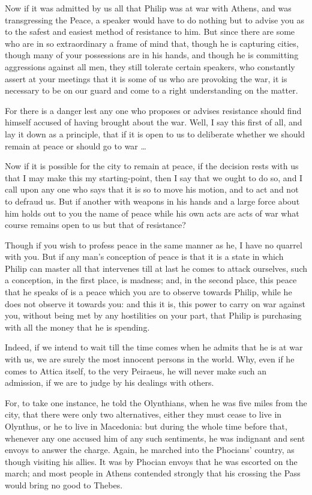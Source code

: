 \documentclass[a4paper]{amsbook}
\begin{document}
Now if it was admitted by us all that Philip was at war with Athens, and was transgressing the Peace, a speaker would have to do nothing but to advise you as to the safest and easiest method of resistance to him. But since there are some who are in so extraordinary a frame of mind that, though he is capturing cities, though many of your possessions are in his hands, and though he is committing aggressions against all men, they still tolerate certain speakers, who constantly assert at your meetings that it is some of us who are provoking the war, it is necessary to be on our guard and come to a right understanding on the matter.

For there is a danger lest any one who proposes or advises resistance should find himself accused of having brought about the war. Well, I say this first of all, and lay it down as a principle, that if it is open to us to deliberate whether we should remain at peace or should go to war \ldots

Now if it is possible for the city to remain at peace, if the decision rests with us that I may make this my starting-point, then I say that we ought to do so, and I call upon any one who says that it is so to move his motion, and to act and not to defraud us. But if another with weapons in his hands and a large force about him holds out to you the name of peace while his own acts are acts of war what course remains open to us but that of resistance?

Though if you wish to profess peace in the same manner as he, I have no quarrel with you. But if any man's conception of peace is that it is a state in which Philip can master all that intervenes till at last he comes to attack ourselves, such a conception, in the first place, is madness; and, in the second place, this peace that he speaks of is a peace which you are to observe towards Philip, while he does not observe it towards you: and this it is, this power to carry on war against you, without being met by any hostilities on your part, that Philip is purchasing with all the money that he is spending.

Indeed, if we intend to wait till the time comes when he admits that he is at war with us, we are surely the most innocent persons in the world. Why, even if he comes to Attica itself, to the very Peiraeus, he will never make such an admission, if we are to judge by his dealings with others.

For, to take one instance, he told the Olynthians, when he was five miles from the city, that there were only two alternatives, either they must cease to live in Olynthus, or he to live in Macedonia: but during the whole time before that, whenever any one accused him of any such sentiments, he was indignant and sent envoys to answer the charge. Again, he marched into the Phocians' country, as though visiting his allies. It was by Phocian envoys that he was escorted on the march; and most people in Athens contended strongly that his crossing the Pass would bring no good to Thebes.
\end{document}
